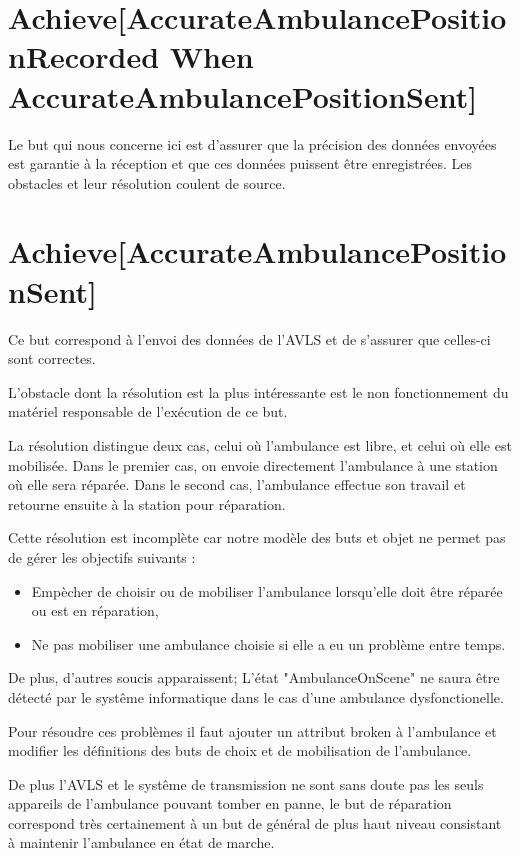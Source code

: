 \section{Achieve[AccurateAmbulancePositionRecorded When AccurateAmbulancePositionSent]}
	Le but qui nous concerne ici est d'assurer que la précision des
	données envoyées est garantie à la réception et que ces données
	puissent être enregistrées. Les obstacles et leur résolution coulent 
	de source.

\section{Achieve[AccurateAmbulancePositionSent]}
	Ce but correspond à l'envoi des données de l'AVLS et de s'assurer
	que celles-ci sont correctes. 

	L'obstacle dont la résolution est la plus intéressante est le non
	fonctionnement du matériel responsable de l'exécution de ce but.

	La résolution distingue deux cas, celui où l'ambulance est libre, et celui
	où elle est mobilisée. Dans le premier cas, on envoie directement
	l'ambulance à une station où elle sera réparée. Dans le second
	cas, l'ambulance effectue son travail et retourne ensuite à la 
	station pour réparation.

	Cette résolution est incomplète car notre modèle des buts et objet
	ne permet pas de gérer les objectifs suivants : 
	\begin{itemize}
		\item Empècher de choisir ou de mobiliser l'ambulance lorsqu'elle
		doit être réparée ou est en réparation,
		\item Ne pas mobiliser une ambulance choisie si elle a eu un
		problème entre temps.
	\end{itemize}

	De plus, d'autres soucis apparaissent; L'état "AmbulanceOnScene"
	ne saura être détecté par le systême informatique dans le
	cas d'une ambulance dysfonctionelle.

	Pour résoudre ces problèmes il faut ajouter un attribut broken
	à l'ambulance et modifier les définitions des buts de choix et
	de mobilisation de l'ambulance. 

	De plus l'AVLS et le systême de transmission ne sont sans doute pas
	les seuls appareils de l'ambulance pouvant tomber en panne, le but
	de réparation correspond très certainement à un but de général de
	plus haut niveau consistant à maintenir l'ambulance en état de marche.

